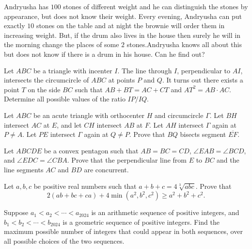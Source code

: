 \documentclass[11pt]{scrartcl}
\begin{document}
\begin{problem}[499788610931519]
	Andryusha has $100$ stones of different weight and he can distinguish the stones by appearance, but does not know their weight. Every evening, Andryusha can put exactly $10$ stones on the table and at night the brownie will order them in increasing weight. But, if the drum also lives in the house then surely he will in the morning change the places of some $2$ stones.Andryusha knows all about this but does not know if there is a drum in his house. Can he find out?
\end{problem}
\begin{problem}[5363953658134647103]
Let $ABC$ be a triangle with incenter $I$. The line through $I$, perpendicular to $AI$, intersects the circumcircle of $ABC$ at points $P$ and $Q$. It turns out there exists a point $T$ on the side $BC$ such that $AB + BT = AC + CT$ and $AT^2 =  AB \cdot AC$. Determine all possible values of the ratio $IP/IQ$.
\end{problem}
\begin{problem}[8528437132500966626]
	Let $ABC$ be an acute triangle with orthocenter $H$ and circumcircle $\Gamma$. Let $BH$ intersect $AC$ at $E$, and let $CH$ intersect $AB$ at $F$. Let $AH$ intersect $\Gamma$ again at $P \neq A$. Let $PE$ intersect $\Gamma$ again at $Q \neq P$. Prove that $BQ$ bisects segment $\overline{EF}$.
\end{problem}
\begin{problem}[7997372712267182584]
Let $ABCDE$ be a convex pentagon such that $AB=BC=CD$, $\angle{EAB}=\angle{BCD}$, and $\angle{EDC}=\angle{CBA}$. Prove that the perpendicular line from $E$ to $BC$ and the line segments $AC$ and $BD$ are concurrent.
\end{problem}
\begin{problem}[329519083206921]
Let \(a,b,c\) be positive real numbers such that \(a+b+c=4\sqrt[3]{abc}\). Prove that\[2(ab+bc+ca)+4\min(a^2,b^2,c^2)\ge a^2+b^2+c^2.\]
\end{problem}
\begin{problem}[12311699525330]
	Suppose $a_{1} < a_{2}< \cdots < a_{2024}$ is an arithmetic sequence of positive integers, and $b_{1} <b_{2} < \cdots <b_{2024}$ is a geometric sequence of positive integers. Find the maximum possible number of integers that could appear in both sequences, over all possible choices of the two sequences.
\end{problem}
\end{document}

